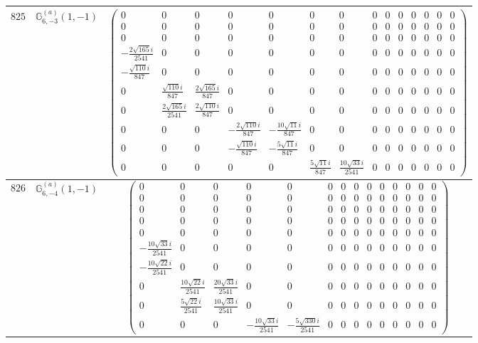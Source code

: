 \documentclass[fleqn,8pt,landscape]{jsarticle}
\begin{document}
\begin{center}
\begin{longtable}{ccc}
$ 825 $ & $ \mathbb{G}_{6,-3}^{(a)}(1,-1) $ & $ \begin{pmatrix} 0 & 0 & 0 & 0 & 0 & 0 & 0 & 0 & 0 & 0 & 0 & 0 & 0 & 0 \\ 0 & 0 & 0 & 0 & 0 & 0 & 0 & 0 & 0 & 0 & 0 & 0 & 0 & 0 \\ 0 & 0 & 0 & 0 & 0 & 0 & 0 & 0 & 0 & 0 & 0 & 0 & 0 & 0 \\ - \frac{2 \sqrt{165} i}{2541} & 0 & 0 & 0 & 0 & 0 & 0 & 0 & 0 & 0 & 0 & 0 & 0 & 0 \\ - \frac{\sqrt{110} i}{847} & 0 & 0 & 0 & 0 & 0 & 0 & 0 & 0 & 0 & 0 & 0 & 0 & 0 \\ 0 & \frac{\sqrt{110} i}{847} & \frac{2 \sqrt{165} i}{847} & 0 & 0 & 0 & 0 & 0 & 0 & 0 & 0 & 0 & 0 & 0 \\ 0 & \frac{2 \sqrt{165} i}{2541} & \frac{2 \sqrt{110} i}{847} & 0 & 0 & 0 & 0 & 0 & 0 & 0 & 0 & 0 & 0 & 0 \\ 0 & 0 & 0 & - \frac{2 \sqrt{110} i}{847} & - \frac{10 \sqrt{11} i}{847} & 0 & 0 & 0 & 0 & 0 & 0 & 0 & 0 & 0 \\ 0 & 0 & 0 & - \frac{\sqrt{110} i}{847} & - \frac{5 \sqrt{11} i}{847} & 0 & 0 & 0 & 0 & 0 & 0 & 0 & 0 & 0 \\ 0 & 0 & 0 & 0 & 0 & \frac{5 \sqrt{11} i}{847} & \frac{10 \sqrt{33} i}{2541} & 0 & 0 & 0 & 0 & 0 & 0 & 0 \end{pmatrix} $ \\ \hline
$ 826 $ & $ \mathbb{G}_{6,-4}^{(a)}(1,-1) $ & $ \begin{pmatrix} 0 & 0 & 0 & 0 & 0 & 0 & 0 & 0 & 0 & 0 & 0 & 0 & 0 & 0 \\ 0 & 0 & 0 & 0 & 0 & 0 & 0 & 0 & 0 & 0 & 0 & 0 & 0 & 0 \\ 0 & 0 & 0 & 0 & 0 & 0 & 0 & 0 & 0 & 0 & 0 & 0 & 0 & 0 \\ 0 & 0 & 0 & 0 & 0 & 0 & 0 & 0 & 0 & 0 & 0 & 0 & 0 & 0 \\ 0 & 0 & 0 & 0 & 0 & 0 & 0 & 0 & 0 & 0 & 0 & 0 & 0 & 0 \\ - \frac{10 \sqrt{33} i}{2541} & 0 & 0 & 0 & 0 & 0 & 0 & 0 & 0 & 0 & 0 & 0 & 0 & 0 \\ - \frac{10 \sqrt{22} i}{2541} & 0 & 0 & 0 & 0 & 0 & 0 & 0 & 0 & 0 & 0 & 0 & 0 & 0 \\ 0 & \frac{10 \sqrt{22} i}{2541} & \frac{20 \sqrt{33} i}{2541} & 0 & 0 & 0 & 0 & 0 & 0 & 0 & 0 & 0 & 0 & 0 \\ 0 & \frac{5 \sqrt{22} i}{2541} & \frac{10 \sqrt{33} i}{2541} & 0 & 0 & 0 & 0 & 0 & 0 & 0 & 0 & 0 & 0 & 0 \\ 0 & 0 & 0 & - \frac{10 \sqrt{33} i}{2541} & - \frac{5 \sqrt{330} i}{2541} & 0 & 0 & 0 & 0 & 0 & 0 & 0 & 0 & 0 \end{pmatrix} $ \\ \hline

\end{longtable}
\end{center}
\end{document}
